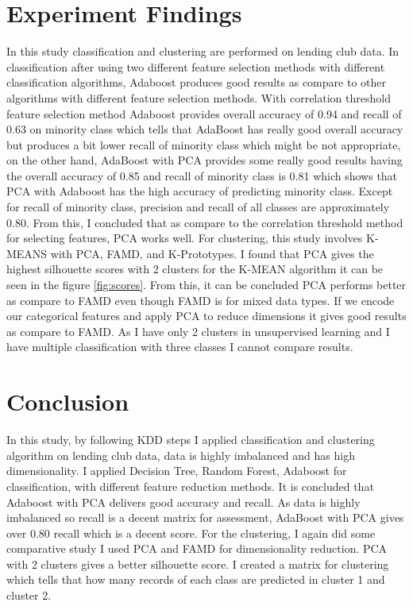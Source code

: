 \documentclass[12pt]{article}
\begin{document}
\section{Experiment Findings}
In this study classification and clustering are performed on lending club data. In classification after using two different feature selection methods with different classification algorithms, Adaboost produces good results as compare to other algorithms with different feature selection methods. With correlation threshold feature selection method Adaboost provides overall accuracy of 0.94 and recall of 0.63 on minority class which tells that AdaBoost has really good overall accuracy but produces a bit lower recall of minority class which might be not appropriate, on the other hand, AdaBoost with PCA provides some really good results having the overall accuracy of 0.85 and recall of minority class is 0.81 which shows that PCA with Adaboost has the high accuracy of predicting minority class. Except for recall of minority class, precision and recall of all classes are approximately 0.80. From this, I concluded that as compare to the correlation threshold method for selecting features, PCA works well. For clustering, this study involves K-MEANS with PCA, FAMD, and K-Prototypes. I found that PCA gives the highest silhouette scores with 2 clusters for the K-MEAN algorithm it can be seen in the figure \ref {fig:scores}. From this, it can be concluded PCA performs better as compare to FAMD even though FAMD is for mixed data types. If we encode our categorical features and apply PCA to reduce dimensions it gives good results as compare to FAMD. As I have only 2 clusters in unsupervised learning and I have multiple classification with three classes I cannot compare results.

\section{Conclusion}
In this study, by following KDD steps I applied classification and clustering algorithm on lending club data, data is highly imbalanced and has high dimensionality. I applied Decision Tree, Random Forest, Adaboost for classification, with different feature reduction methods. It is concluded that Adaboost with PCA delivers good accuracy and recall. As data is highly imbalanced so recall is a decent matrix for assessment, AdaBoost with PCA gives over 0.80 recall which is a decent score. For the clustering, I again did some comparative study I used PCA and FAMD for dimensionality reduction. PCA with 2 clusters gives a better silhouette score. I created a matrix for clustering which tells that how many records of each class are predicted in cluster 1 and cluster 2.

\singlespacing



\end{document}
